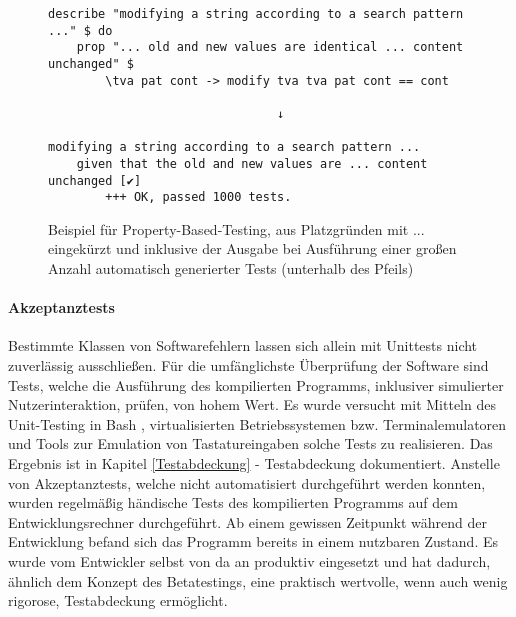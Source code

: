 \begin{figure}
    \caption{Beispiel für \gls{Property-Based-Testing}, aus Platzgründen mit ... eingekürzt und inklusive
        der Ausgabe bei Ausführung einer großen Anzahl automatisch generierter Tests (unterhalb des Pfeils)}
    \label{property-test}
    \begin{verbatim}
describe "modifying a string according to a search pattern ..." $ do
    prop "... old and new values are identical ... content unchanged" $
        \tva pat cont -> modify tva tva pat cont == cont

                                ↓

modifying a string according to a search pattern ...
    given that the old and new values are ... content unchanged [✔]
        +++ OK, passed 1000 tests.
    \end{verbatim}
\end{figure}

\paragraph{Akzeptanztests}
Bestimmte Klassen von Softwarefehlern lassen sich allein mit Unittests nicht
zuverlässig ausschließen. Für die umfänglichste Überprüfung der Software sind
Tests, welche die Ausführung des kompilierten Programms, inklusiver simulierter
Nutzerinteraktion, prüfen, von hohem Wert. Es wurde versucht mit Mitteln des
Unit-Testing in Bash \cite{bats}, virtualisierten Betriebssystemen \cite{virtualbox} \cite{docker}
bzw. \gls{Terminalemulator}en und Tools zur Emulation von Tastatureingaben \cite{xdotool} \cite{ydotool}
solche Tests zu realisieren. Das Ergebnis ist in Kapitel
\ref{Testabdeckung} - Testabdeckung dokumentiert. Anstelle von Akzeptanztests,
welche nicht automatisiert durchgeführt werden konnten, wurden regelmäßig händische
Tests des kompilierten Programms auf dem Entwicklungsrechner durchgeführt. Ab einem
gewissen Zeitpunkt während der Entwicklung befand sich das Programm bereits in einem nutzbaren
Zustand. Es wurde vom Entwickler selbst von da an produktiv eingesetzt und hat
dadurch, ähnlich dem Konzept des \gls{Betatesting}s, eine praktisch wertvolle,
wenn auch wenig rigorose, Testabdeckung ermöglicht.